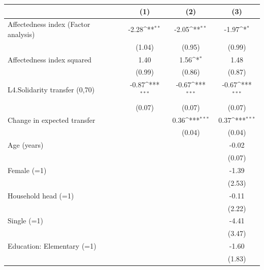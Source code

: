 {
\def\sym#1{\ifmmode^{#1}\else\(^{#1}\)\fi}
\begin{tabular}{l*{3}{c}}
\toprule
                    &\multicolumn{1}{c}{(1)}         &\multicolumn{1}{c}{(2)}         &\multicolumn{1}{c}{(3)}         \\
\midrule
Affectedness index (Factor analysis)&       -2.28\sym{**} &       -2.05\sym{**} &       -1.97\sym{*}  \\
                    &      (1.04)         &      (0.95)         &      (0.99)         \\
Affectedness index squared&        1.40         &        1.56\sym{*}  &        1.48         \\
                    &      (0.99)         &      (0.86)         &      (0.87)         \\
L4.Solidarity transfer (0,70)&       -0.87\sym{***}&       -0.67\sym{***}&       -0.67\sym{***}\\
                    &      (0.07)         &      (0.07)         &      (0.07)         \\
Change in expected transfer&                     &        0.36\sym{***}&        0.37\sym{***}\\
                    &                     &      (0.04)         &      (0.04)         \\
Age (years)         &                     &                     &       -0.02         \\
                    &                     &                     &      (0.07)         \\
Female (=1)         &                     &                     &       -1.39         \\
                    &                     &                     &      (2.53)         \\
Household head (=1) &                     &                     &       -0.11         \\
                    &                     &                     &      (2.22)         \\
Single (=1)         &                     &                     &       -4.41         \\
                    &                     &                     &      (3.47)         \\
Education: Elementary (=1)&                     &                     &       -1.60         \\
                    &                     &                     &      (1.83)         \\

\end{tabular}}
